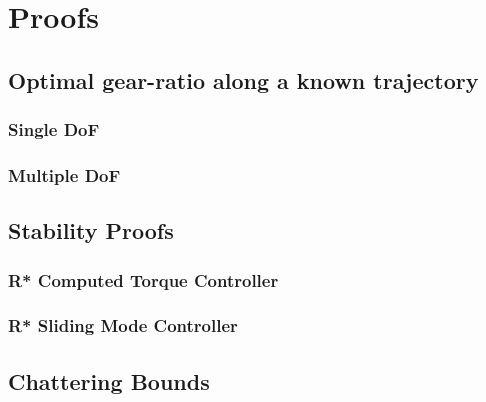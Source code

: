 \chapter{Proofs}
\label{sec:proofs}


\section{Optimal gear-ratio along a known trajectory}
\label{sec:optgearproof}


\subsection{Single DoF}
\label{sec:optgearproof1}


\subsection{Multiple DoF}
\label{sec:optgearproofn}


\section{Stability Proofs}
\label{sec:stabproofs}


\subsection{R* Computed Torque Controller}
\label{sec:stabrstar}


\subsection{R* Sliding Mode Controller}
\label{sec:stabrstar}


\section{Chattering Bounds}
\label{sec:chat}

